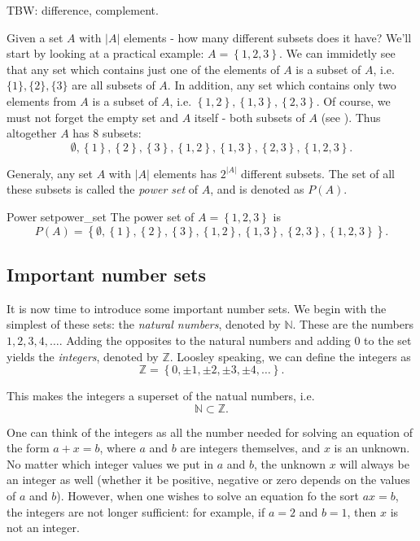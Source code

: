 TBW: difference, complement.

Given a set $A$ with $|A|$ elements - how many different subsets does it have? We'll start by looking at a practical example: $A=\left\{ 1,2,3 \right\}$. We can immidetly see that any set which contains just one of the elements of $A$ is a subset of $A$, i.e. $\{1\},\{2\},\{3\}$ are all subsets of $A$. In addition, any set which contains only two elements from $A$ is a subset of $A$, i.e. $\left\{ 1,2 \right\}, \left\{ 1,3 \right\}, \left\{ 2,3 \right\}$. Of course, we must not forget the empty set and $A$ itself - both subsets of $A$ (see ). Thus altogether $A$ has $8$ subsets:
\[
	\emptyset, \left\{ 1 \right\}, \left\{ 2 \right\}, \left\{ 3 \right\}, \left\{ 1,2 \right\}, \left\{ 1,3 \right\}, \left\{ 2,3 \right\}, \left\{ 1,2,3 \right\}.
\]

Generaly, any set $A$ with $|A|$ elements has $2^{|A|}$ different subsets. The set of all these subsets is called the \emph{power set} of $A$, and is denoted as $P(A)$.

\begin{example}{Power set}{power_set}
	The power set of $A=\left\{ 1,2,3 \right\}$ is
	\[
		P(A) = \left\{ \emptyset, \left\{ 1 \right\}, \left\{ 2 \right\}, \left\{ 3 \right\}, \left\{ 1,2 \right\}, \left\{ 1,3 \right\}, \left\{ 2,3 \right\}, \left\{ 1,2,3 \right\}\right\}.
	\]
\end{example}

\subsection{Important number sets}
It is now time to introduce some important number sets. We begin with the simplest of these sets: the \emph{natural numbers}, denoted by $\mathbb{N}$. These are the numbers $1,2,3,4,\dots$. Adding the opposites to the natural numbers and adding $0$ to the set yields the \emph{integers}, denoted by $\mathbb{Z}$. Loosley speaking, we can define the integers as
\begin{equation}
	\mathbb{Z}=\left\{ 0,\pm1,\pm2,\pm3,\pm4,\dots \right\}.
	\label{eq:integers}
\end{equation}

This makes the integers a superset of the natual numbers, i.e.
\begin{equation}
	\mathbb{N} \subset \mathbb{Z}.
	\label{eq:naturals_subset_integers}
\end{equation}

One can think of the integers as all the number needed for solving an equation of the form $a+x=b$, where $a$ and $b$ are integers themselves, and $x$ is an unknown. No matter which integer values we put in $a$ and $b$, the unknown $x$ will always be an integer as well (whether it be positive, negative or zero depends on the values of $a$ and $b$). However, when one wishes to solve an equation fo the sort $ax=b$, the integers are not longer sufficient: for example, if $a=2$ and $b=1$, then $x$ is not an integer.

